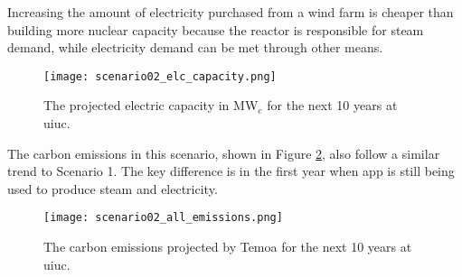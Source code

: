 Increasing the amount of electricity purchased
from a wind farm is cheaper than building more nuclear capacity because the
reactor is responsible for steam demand, while electricity demand can be met
through other means.

\begin{figure}[ht!]
	\centering
	\texttt{[image: scenario02\_elc\_capacity.png]}
	\caption{The projected electric capacity in MW$_{e}$ for the next 10 years at
	\gls{uiuc}.}
	\label{fig:s02_elc_cap}
\end{figure}

The carbon emissions in this scenario, shown in Figure \ref{fig:s02_all_co2},
also follow a similar trend to Scenario 1. The key difference is in the first
year when \gls{app} is still being used to produce steam and electricity.

\begin{figure}[ht!]
	\centering
	\texttt{[image: scenario02\_all\_emissions.png]}
	\caption{The carbon emissions projected by Temoa for the next 10 years at
	\gls{uiuc}.}
	\label{fig:s02_all_co2}
\end{figure}

